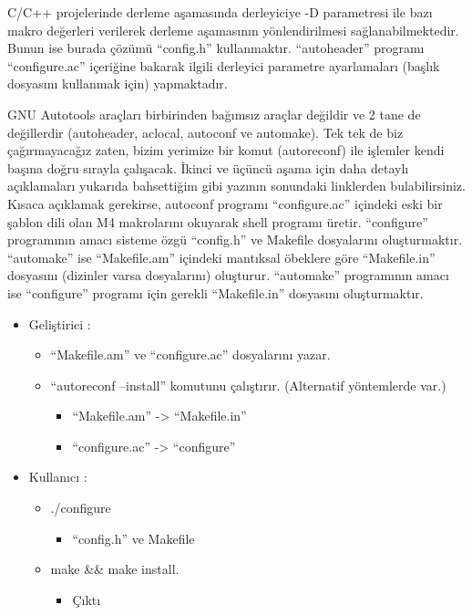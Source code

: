\documentclass[
]{book}
\providecommand{\tightlist}{%
  \setlength{\itemsep}{0pt}\setlength{\parskip}{0pt}}
\begin{document}
C/C++ projelerinde derleme aşamasında derleyiciye -D parametresi ile bazı makro değerleri verilerek derleme aşamasının yönlendirilmesi sağlanabilmektedir. Bunun ise burada çözümü ``config.h'' kullanmaktır. ``autoheader'' programı ``configure.ac'' içeriğine bakarak ilgili derleyici parametre ayarlamaları (başlık dosyasını kullanmak için) yapmaktadır.

GNU Autotools araçları birbirinden bağımsız araçlar değildir ve 2 tane de değillerdir (autoheader, aclocal, autoconf ve automake). Tek tek de biz çağırmayacağız zaten, bizim yerimize bir komut (autoreconf) ile işlemler kendi başına doğru sırayla çalışacak. İkinci ve üçüncü aşama için daha detaylı açıklamaları yukarıda bahsettiğim gibi yazının sonundaki linklerden bulabilirsiniz. Kısaca açıklamak gerekirse, autoconf programı ``configure.ac'' içindeki eski bir şablon dili olan M4 makrolarını okuyarak shell programı üretir. ``configure'' programının amacı sisteme özgü ``config.h'' ve Makefile dosyalarını oluşturmaktır. ``automake'' ise ``Makefile.am'' içindeki mantıksal öbeklere göre ``Makefile.in'' dosyasını (dizinler varsa dosyalarını) oluşturur. ``automake'' programının amacı ise ``configure'' programı için gerekli ``Makefile.in'' dosyasını oluşturmaktır.

\begin{itemize}
\tightlist
\item
  Geliştirici :

  \begin{itemize}
  \tightlist
  \item
    ``Makefile.am'' ve ``configure.ac'' dosyalarını yazar.
  \item
    ``autoreconf --install'' komutunu çalıştırır. (Alternatif yöntemlerde var.)

    \begin{itemize}
    \tightlist
    \item
      ``Makefile.am'' -\textgreater{} ``Makefile.in''
    \item
      ``configure.ac'' -\textgreater{} ``configure''
    \end{itemize}
  \end{itemize}
\item
  Kullanıcı :

  \begin{itemize}
  \tightlist
  \item
    ./configure

    \begin{itemize}
    \tightlist
    \item
      ``config.h'' ve Makefile
    \end{itemize}
  \item
    make \&\& make install.

    \begin{itemize}
    \tightlist
    \item
      Çıktı
    \end{itemize}
  \end{itemize}
\end{itemize}
\end{document}
